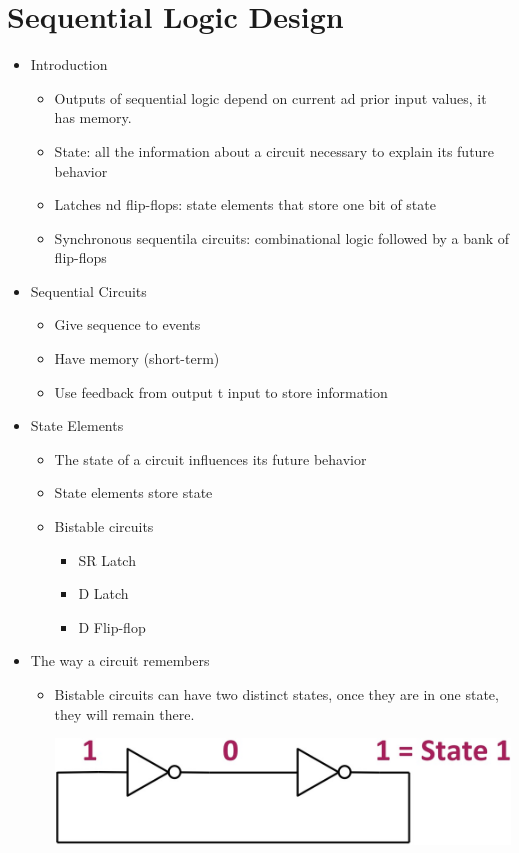 \documentclass[a4paper]{article}
\begin{document}
\section{Sequential Logic Design}
	\begin{itemize}
		\item Introduction
			\begin{itemize}
				\item Outputs of sequential logic depend on current ad prior input values, it has memory.
				\item State: all the information about a circuit necessary to explain its future behavior
				\item Latches nd flip-flops: state elements that store one bit of state
				\item Synchronous sequentila circuits: combinational logic followed by a bank of flip-flops
			\end{itemize}
		\item Sequential Circuits
			\begin{itemize}
				\item Give sequence to events
				\item Have memory (short-term)
				\item Use feedback from output t input to store information 
			\end{itemize}
		\item State Elements
			\begin{itemize}
				\item The state of a circuit influences its future behavior
				\item State elements store state
				\item Bistable circuits
					\begin{itemize}
						\item SR Latch
						\item D Latch
						\item D Flip-flop
					\end{itemize}
			\end{itemize}
		\item The way a circuit remembers
			\begin{itemize}
				\item Bistable circuits can have two distinct states, once they are in one state, they will remain there.\\
					\begin{center}
						\includegraphics[scale=0.25]{Figures/BistableCircuit.jpg}

\end{center}
\end{itemize}
\end{itemize}
\end{document}
